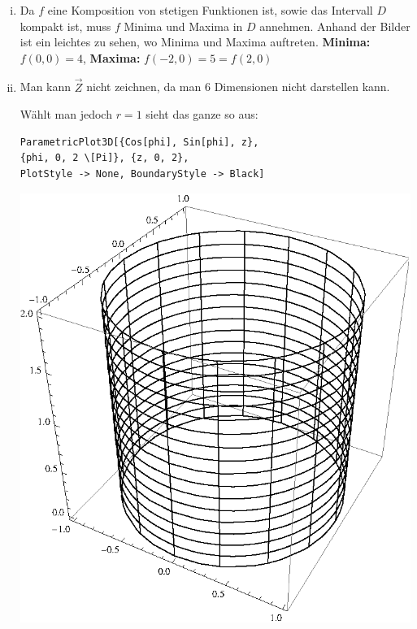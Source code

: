 \documentclass[10pt,a4paper]{scrartcl}
\begin{document}
\begin{enumerate}[(i)]
\begin{minipage}{0.50\columnwidth}
\begin{center}
\end{center}
\end{minipage}
\item 
Da $f$ eine Komposition von stetigen Funktionen ist, sowie das Intervall $D$ kompakt ist, muss $f$ Minima und Maxima in $D$ annehmen. Anhand der Bilder ist ein leichtes zu sehen, wo Minima und Maxima auftreten. \textbf{Minima: } $f(0,0) = 4$, \textbf{Maxima: } %
$f(-2,0) = 5 = f(2,0)$
\item 
Man kann $\vec{Z}$ nicht zeichnen, da man 6 Dimensionen nicht darstellen kann.  \\
\begin{minipage}{0.49\columnwidth}
Wählt man jedoch $r=1$ sieht das ganze so aus:
\begin{lstlisting}[caption= Mathematica Code für den Graph von Z]
ParametricPlot3D[{Cos[phi], Sin[phi], z}, 
{phi, 0, 2 \[Pi]}, {z, 0, 2}, 
PlotStyle -> None, BoundaryStyle -> Black]
\end{lstlisting}
\end{minipage}
\begin{minipage}{0.50\columnwidth}
\begin{center}
\includegraphics[scale=0.7]{1iv.eps} 
\end{center}

\end{minipage}
\end{enumerate}
\end{document}
